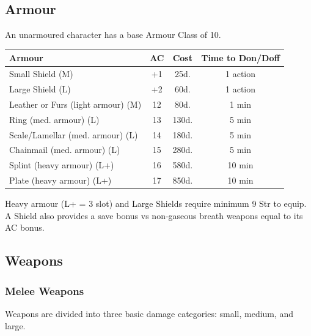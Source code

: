 \documentclass{book}
\begin{document}
\subsection*{Armour}\label{armour}

An unarmoured character has a base Armour Class of 10.

\begin{table}[ht]
\centering
    \begin{tabular}{lccc}
    \toprule
    Armour & AC & Cost & Time to Don/Doff \\
    \midrule
    Small Shield (M) & +1 & 25d. & 1 action \\
    Large Shield (L) & +2 & 60d. & 1 action \\
    Leather or Furs (light armour) (M) & 12 & 80d. & 1 min \\
    Ring (med. armour) (L) & 13 & 130d. & 5 min \\
    Scale/Lamellar (med. armour) (L) & 14 & 180d. & 5 min \\
    Chainmail (med. armour) (L) & 15 & 280d. & 5 min \\
    Splint (heavy armour) (L+) & 16 & 580d. & 10 min \\
    Plate (heavy armour) (L+) & 17 & 850d. & 10 min \\
    \bottomrule
    \end{tabular}
\end{table}

Heavy armour (L+ = 3 slot) and Large Shields require minimum 9 Str to equip. A Shield also provides a save bonus vs non-gaseous breath weapons equal to its AC bonus.

\subsection*{Weapons}\label{weapons}

\subsubsection*{Melee Weapons}\label{melee-weapons}


Weapons are divided into three basic damage categories: small, medium,
and large.
\end{document}
